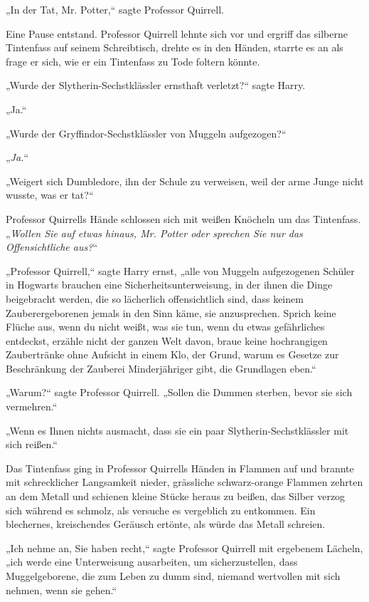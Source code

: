 {„In der Tat, Mr. Potter,“ sagte Professor Quirrell.

Eine Pause entstand. Professor Quirrell lehnte sich vor und ergriff das silberne Tintenfass auf seinem Schreibtisch, drehte es in den Händen, starrte es an als frage er sich, wie er ein Tintenfass zu Tode foltern könnte.

„Wurde der Slytherin-Sechstklässler ernsthaft verletzt?“ sagte Harry.

„Ja.“

„Wurde der Gryffindor-Sechstklässler von Muggeln aufgezogen?“

„\emph{Ja.}“

„Weigert sich Dumbledore, ihn der Schule zu verweisen, weil der arme Junge nicht wusste, was er tat?“

Professor Quirrells Hände schlossen sich mit weißen Knöcheln um das Tintenfass. „\emph{Wollen Sie auf etwas hinaus, Mr. Potter oder sprechen Sie nur das} \emph{Offensichtliche aus?}“

„Professor Quirrell,“ sagte Harry ernst, „alle von Muggeln aufgezogenen Schüler in Hogwarts brauchen eine Sicherheitsunterweisung, in der ihnen die Dinge beigebracht werden, die so lächerlich offensichtlich sind, dass keinem Zauberergeborenen jemals in den Sinn käme, sie anzusprechen. Sprich keine Flüche aus, wenn du nicht weißt, was sie tun, wenn du etwas gefährliches entdeckst, erzähle nicht der ganzen Welt davon, braue keine hochrangigen Zaubertränke ohne Aufsicht in einem Klo, der Grund, warum es Gesetze zur Beschränkung der Zauberei Minderjähriger gibt, die Grundlagen eben.“

„Warum?“ sagte Professor Quirrell. „Sollen die Dummen sterben, bevor sie sich vermehren.“

„Wenn es Ihnen nichts ausmacht, dass sie ein paar Slytherin-Sechstklässler mit sich reißen.“

Das Tintenfass ging in Professor Quirrells Händen in Flammen auf und brannte mit schrecklicher Langsamkeit nieder, grässliche schwarz-orange Flammen zehrten an dem Metall und schienen kleine Stücke heraus zu beißen, das Silber verzog sich während es schmolz, als versuche es vergeblich zu entkommen. Ein blechernes, kreischendes Geräusch ertönte, als würde das Metall schreien.

„Ich nehme an, Sie haben recht,“ sagte Professor Quirrell mit ergebenem Lächeln, „ich werde eine Unterweisung ausarbeiten, um sicherzustellen, dass Muggelgeborene, die zum Leben zu dumm sind, niemand wertvollen mit sich nehmen, wenn sie gehen.“

}
